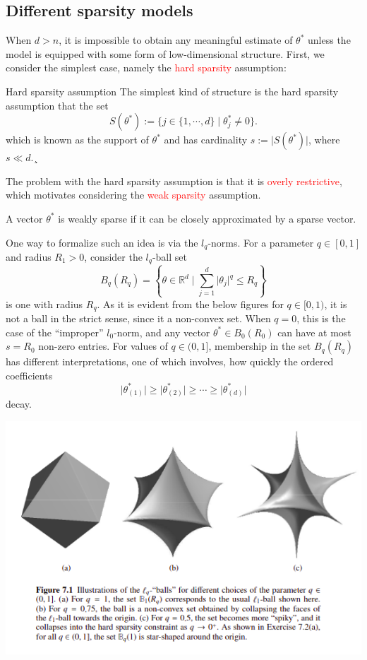 \documentclass[10pt,handout,english]{beamer}
\newcommand{\R}{\mathbb{R}}
\begin{document}
\subsection{Different sparsity models}
\begin{frame}[allowframebreaks]
When $d>n$, it is impossible to obtain any meaningful estimate of $\theta^*$ unless the model is equipped with some form of low-dimensional structure. First, we consider the simplest case, namely the \textcolor{red}{hard sparsity} assumption:

\begin{block}{Hard sparsity assumption}
The simplest kind of structure is the hard sparsity assumption that the set
\[
S(\theta^*):=\{j\in\{1,\cdots,d\}\mid\theta_j^*\neq 0\}.
\]
which is known as the support of $\theta^*$ and has cardinality $s:=\lvert S(\theta^*)\rvert$, where $s\ll d$.¸
\end{block}
The problem with the hard sparsity assumption is that it is \textcolor{red}{overly restrictive}, which motivates considering the \textcolor{red}{weak sparsity} assumption.
\begin{definition}
A vector $\theta^*$ is weakly sparse if it can be closely approximated by a sparse vector.
\end{definition}
One way to formalize such an idea is via the $l_q$-norms. For a parameter $q\in[0,1]$ and radius $R_1>0$, consider the $l_q$-ball set
\[
B_q(R_q)=\left\{\theta\in\R^d\mid\sum\limits_{j=1}^{d}\lvert \theta_j\rvert^q\leq R_q\right\}
\]  
is one with radius $R_q$. As it is evident from the below figures for $q\in[0,1)$, it is not a ball in the strict sense, since it a non-convex set. When $q=0$, this is the case of the \textquotedblleft improper\textquotedblright{ }$l_0$-norm, and any vector $\theta^*\in B_0(R_0)$ can have at most $s=R_0$ non-zero entries. For values of $q\in (0,1]$, membership in the set $B_q(R_q)$ has different interpretations, one of which involves, how quickly the ordered coefficients
\[
\lvert \theta_{(1)}^*\rvert\geq\lvert \theta_{(2)}^*\rvert\geq\cdots\geq\lvert \theta_{(d)}^*\rvert
\]
decay.
\end{frame}
\begin{frame}
\includegraphics[width=\textwidth, height=\textheight]{lqballs.png}
\end{frame}
\end{document}
